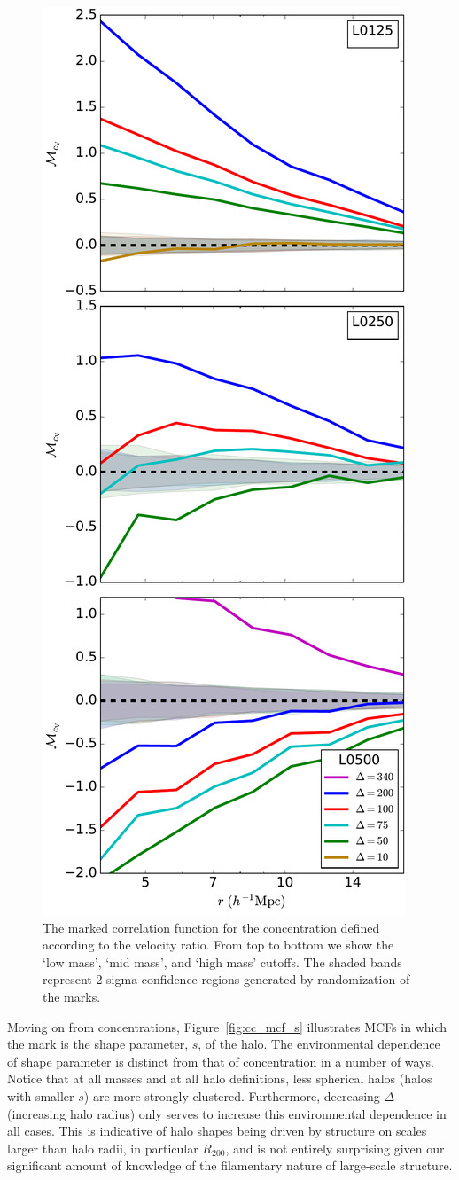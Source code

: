 \documentclass[usenatbib,usegraphicx,letterpaper]{mn2e}
\begin{document}
\begin{figure}
	\centering
	\includegraphics[width=.4\textwidth]{all_mcf_cV.pdf}
	\caption{The marked correlation function for the concentration defined according to the velocity ratio. From top to bottom we show the `low mass', `mid mass', and `high mass' cutoffs. The shaded bands represent 2-sigma confidence regions generated by randomization of the marks.
}
	\label{fig:cc_mcf_cV}
\end{figure}

Moving on from concentrations, Figure~\ref{fig:cc_mcf_s} illustrates MCFs in which the mark is the shape
parameter, $s$, of the halo. The environmental dependence of shape parameter is distinct from that of
concentration in a number of ways. Notice that at all masses and at all halo definitions, less spherical halos
(halos with smaller $s$) are more strongly clustered. Furthermore, decreasing $\Delta$ (increasing halo radius)
only serves to increase this environmental dependence in all cases. This is indicative of halo shapes being
driven by structure on scales larger than halo radii, in particular $R_{200}$, and is not entirely surprising
given our significant amount of knowledge of the filamentary nature of large-scale structure. 
\end{document}
